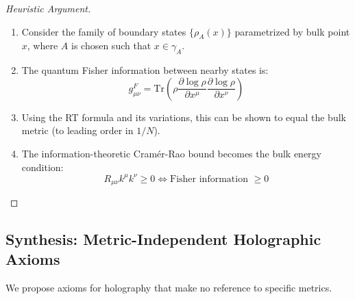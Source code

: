 \documentclass[12pt,a4paper]{article}
\begin{document}
\begin{proof}[Heuristic Argument]
\begin{enumerate}
    \item Consider the family of boundary states $\{\rho_A(x)\}$ parametrized by bulk point $x$, where $A$ is chosen such that $x \in \gamma_A$.
    
    \item The quantum Fisher information between nearby states is:
    \begin{equation}
    g^F_{\mu\nu} = \text{Tr}\left( \rho \frac{\partial \log \rho}{\partial x^\mu} \frac{\partial \log \rho}{\partial x^\nu} \right)
    \end{equation}
    
    \item Using the RT formula and its variations, this can be shown to equal the bulk metric (to leading order in $1/N$).
    
    \item The information-theoretic Cram\'er-Rao bound becomes the bulk energy condition:
    \begin{equation}
    R_{\mu\nu} k^\mu k^\nu \geq 0 \Leftrightarrow \text{Fisher information } \geq 0
    \end{equation}
\end{enumerate}
\end{proof}

\subsection{Synthesis: Metric-Independent Holographic Axioms}

We propose axioms for holography that make no reference to specific metrics.
\end{document}
